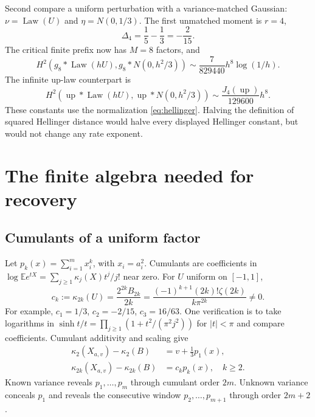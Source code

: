\documentclass[11pt,a4paper]{article}
\numberwithin{equation}{section}
\theoremstyle{definition}
\theoremstyle{remark}
\DeclareMathOperator{\Law}{Law}
\newcommand{\E}{\mathbb E}
\newcommand{\up}{\operatorname{up}}
\begin{document}
Second compare a uniform perturbation with a variance-matched Gaussian:
$\nu=\Law(U)$ and $\eta=N(0,1/3)$. The first unmatched moment is $r=4$,
\begin{equation}
 \Delta_4=\frac15-\frac13=-\frac2{15}.
 \label{eq:delta4-single}
\end{equation}
The critical finite prefix now has $M=8$ factors, and
\begin{equation}
 H^2(g_8*\Law(hU),g_8*N(0,h^2/3))
 \sim\frac7{829440}h^8\log(1/h).
 \label{eq:M8}
\end{equation}
The infinite up-law counterpart is
\begin{equation}
 H^2(\up*\Law(hU),\up*N(0,h^2/3))
 \sim\frac{J_4(\up)}{129600}h^8.
 \label{eq:up-confounded}
\end{equation}
These constants use the normalization \eqref{eq:hellinger}. Halving the
definition of squared Hellinger distance would halve every displayed
Hellinger constant, but would not change any rate exponent.

\section{The finite algebra needed for recovery}
\label{sec:algebra}

\subsection{Cumulants of a uniform factor}
Let $p_k(x)=\sum_{i=1}^m x_i^k$, with $x_i=a_i^2$. Cumulants are
coefficients in
$\log\E e^{tX}=\sum_{j\ge1}\kappa_j(X)t^j/j!$ near zero.
For $U$ uniform on $[-1,1]$,
\begin{equation}
 c_k:=\kappa_{2k}(U)
 =\frac{2^{2k}B_{2k}}{2k}
 =\frac{(-1)^{k+1}(2k)!\zeta(2k)}{k\pi^{2k}}\ne0.
 \label{eq:cumulants}
\end{equation}
For example, $c_1=1/3$, $c_2=-2/15$, $c_3=16/63$.
One verification is to take logarithms in
$\sinh t/t=\prod_{j\ge1}(1+t^2/(\pi^2j^2))$ for $|t|<\pi$
and compare coefficients. Cumulant additivity and scaling give
\begin{align}
 \kappa_2(X_{a,v})-\kappa_2(B)&=v+\tfrac13p_1(x),
 \label{eq:kappa2}\\
 \kappa_{2k}(X_{a,v})-\kappa_{2k}(B)&=c_kp_k(x),\quad k\ge2.
 \label{eq:kappahigher}
\end{align}
Known variance reveals $p_1,\ldots,p_m$ through cumulant order $2m$.
Unknown variance conceals $p_1$ and reveals the consecutive window
$p_2,\ldots,p_{m+1}$ through order $2m+2$.
\end{document}
